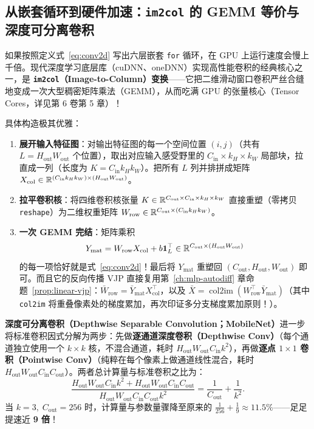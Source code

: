 \subsection{从嵌套循环到硬件加速：\texttt{im2col} 的 GEMM 等价与深度可分离卷积}

如果按照定义式~\eqref{eq:conv2d} 写出六层嵌套 \texttt{for} 循环，在 GPU 上运行速度会慢上千倍。现代深度学习底层库（cuDNN、oneDNN）实现高性能卷积的经典核心之一，是 \textbf{\texttt{im2col}（Image-to-Column）变换}——它把二维滑动窗口卷积严丝合缝地变成一次大型稠密矩阵乘法（GEMM），从而吃满 GPU 的张量核心（Tensor Cores，详见第 6 卷第 5 章）！

具体构造极其优雅：
\begin{enumerate}
  \item \textbf{展开输入特征图}：对输出特征图的每一个空间位置 $(i, j)$（共有 $L = H_{\text{out}} W_{\text{out}}$ 个位置），取出对应输入感受野里的 $C_{\text{in}} \times k_H \times k_W$ 局部块，拉直成一列（长度为 $K = C_{\text{in}} k_H k_W$）。把所有 $L$ 列并排拼成矩阵 $X_{\text{col}} \in \mathbb{R}^{(C_{\text{in}} k_H k_W) \times (H_{\text{out}} W_{\text{out}})}$。
  \item \textbf{拉平卷积核}：将四维卷积核张量 $K \in \mathbb{R}^{C_{\text{out}} \times C_{\text{in}} \times k_H \times k_W}$ 直接重塑（零拷贝 \texttt{reshape}）为二维权重矩阵 $W_{\text{row}} \in \mathbb{R}^{C_{\text{out}} \times (C_{\text{in}} k_H k_W)}$。
  \item \textbf{一次 GEMM 完结}：矩阵乘积
  \[
    Y_{\text{mat}} = W_{\text{row}} X_{\text{col}} + b \mathbf{1}_L^\top \in \mathbb{R}^{C_{\text{out}} \times (H_{\text{out}} W_{\text{out}})}
  \]
  的每一项恰好就是式~\eqref{eq:conv2d}！最后将 $Y_{\text{mat}}$ 重塑回 $(C_{\text{out}}, H_{\text{out}}, W_{\text{out}})$ 即可。而且它的反向传播 VJP 直接复用第~\ref{ch:mlp-autodiff} 章命题~\ref{prop:linear-vjp}：$\bar{W}_{\text{row}} = \bar{Y}_{\text{mat}} X_{\text{col}}^\top$，以及 $\bar{X} = \operatorname{col2im}(W_{\text{row}}^\top \bar{Y}_{\text{mat}})$（其中 \texttt{col2im} 将重叠像素处的梯度累加，再次印证多分支梯度累加原则！）。
\end{enumerate}

\textbf{深度可分离卷积（Depthwise Separable Convolution；MobileNet）}进一步将标准卷积因式分解为两步：先做\textbf{逐通道深度卷积（Depthwise Conv）}（每个通道独立使用一个 $k \times k$ 核，不混合通道，耗时 $H_{\text{out}} W_{\text{out}} C_{\text{in}} k^2$），再做\textbf{逐点 $1\times 1$ 卷积（Pointwise Conv）}（纯粹在每个像素上做通道线性混合，耗时 $H_{\text{out}} W_{\text{out}} C_{\text{in}} C_{\text{out}}$）。两者总计算量与标准卷积之比为：
\begin{equation}
  \frac{H_{\text{out}} W_{\text{out}} C_{\text{in}} k^2 + H_{\text{out}} W_{\text{out}} C_{\text{in}} C_{\text{out}}}{H_{\text{out}} W_{\text{out}} C_{\text{in}} C_{\text{out}} k^2}
  = \frac{1}{C_{\text{out}}} + \frac{1}{k^2}.
  \label{eq:dw-sep-ratio}
\end{equation}
当 $k = 3,\; C_{\text{out}} = 256$ 时，计算量与参数量骤降至原来的 $\frac{1}{256} + \frac{1}{9} \approx 11.5\%$——足足提速近 \textbf{9 倍}！

